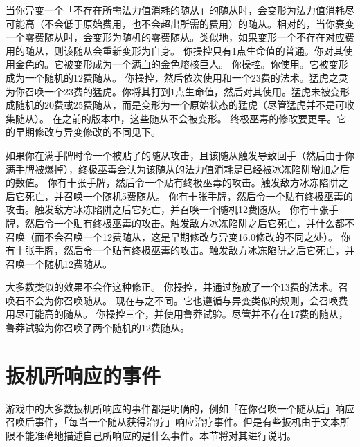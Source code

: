  当你异变一个「不存在所需法力值消耗的随从」的随从时，会变形为法力值消耗尽可能高（不会低于原始费用，也不会超出所需的费用）的随从。相对的，当你衰变一个零费随从时，会变形为随机的零费随从。类似地，如果变形一个不存在对应费用的随从，则该随从会重新变形为自身。
\example 你操控只有1点生命值的普通。你对其使用金色的。它被变形成为一个满血的金色熔核巨人。
\example 你操控。你使用。它被变形成为一个随机的12费随从。
\example 你操控，然后依次使用和一个23费的法术。猛虎之灵为你召唤一个23费的猛虎。你将其打到1点生命值，然后对其使用。猛虎未被变形成随机的20费或25费随从，而是变形为一个原始状态的猛虎（尽管猛虎并不是可收集随从）。
\notice 在之前的版本中，这些随从不会被变形。
\notice 终极巫毒的修改要更早。它的早期修改与异变修改的不同见下。

如果你在满手牌时令一个被贴了的随从攻击，且该随从触发导致回手（然后由于你满手牌被爆掉），终极巫毒会认为该随从的法力值消耗是已经被冰冻陷阱增加之后的数值。
\example 你有十张手牌，然后令一个贴有终极巫毒的攻击。触发敌方冰冻陷阱之后它死亡，并召唤一个随机5费随从。
\example {} 你有十张手牌，然后令一个贴有终极巫毒的攻击。触发敌方冰冻陷阱之后它死亡，并召唤一个随机12费随从。
\example {} 你有十张手牌，然后令一个贴有终极巫毒的攻击。触发敌方冰冻陷阱之后它死亡，并什么都不召唤（而不会召唤一个12费随从，这是早期修改与异变16.0修改的不同之处）。
\example {} 你有十张手牌，然后令一个贴有终极巫毒的攻击。触发敌方冰冻陷阱之后它死亡，并召唤一个随机12费随从。

\notice 大多数类似的效果不会作这种修正。
\example 你操控，并通过施放了一个13费的法术。召唤石不会为你召唤随从。
\exception {} 现在与之不同。它也遵循与异变类似的规则，会召唤费用尽可能高的随从。
\example 你操控三个，并使用鲁莽试验。尽管并不存在17费的随从，鲁莽试验为你召唤了两个随机的12费随从。

\setcounter{tocdepth}{1}
\section{扳机所响应的事件}

游戏中的大多数扳机所响应的事件都是明确的，例如「在你召唤一个随从后」响应召唤后事件，「每当一个随从获得治疗」响应治疗事件。但是有些扳机由于文本所限不能准确地描述自己所响应的是什么事件。本节将对其进行说明。

